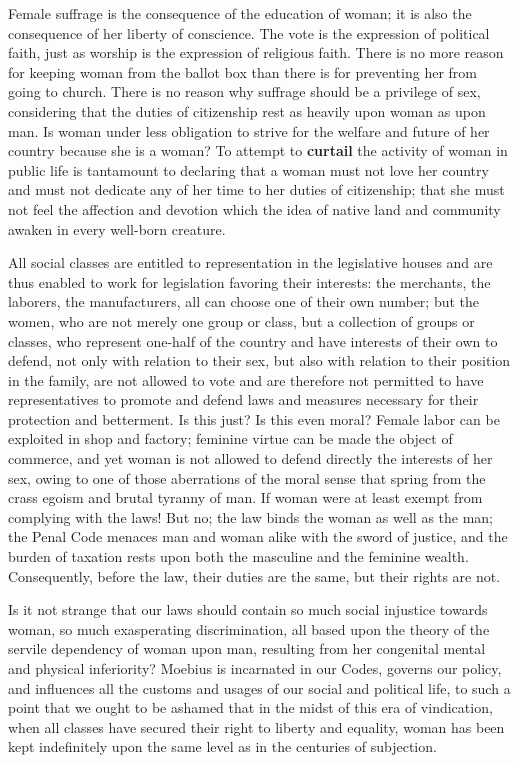 \begin{linenumbers}
\indent Female suffrage is the consequence of the education of woman; it is also the consequence of her liberty of conscience. The vote is the expression of political faith, just as worship is the expression of religious faith. There is no more reason for keeping woman from the ballot box than there is for preventing her from going to church. There is no reason why suffrage should be a privilege of sex, considering that the duties of citizenship rest as heavily upon woman as upon man. Is woman under less obligation to strive for the welfare and future of her country because she is a woman? To attempt to \textbf{curtail} the activity of woman in public life is tantamount to declaring that a woman must not love her country and must not dedicate any of her time to her duties of citizenship; that she must not feel the affection and devotion which the idea of native land and community awaken in every well-born creature.


\indent All social classes are entitled to representation in the legislative houses and are thus enabled to work for legislation favoring their interests: the merchants, the laborers, the manufacturers, all can choose one of their own number; but the women, who are not merely one group or class, but a collection of groups or classes, who represent one-half of the country and have interests of their own to defend, not only with relation to their sex, but also with relation to their position in the family, are not allowed to vote and are therefore not permitted to have representatives to promote and defend laws and measures necessary for their protection and betterment. Is this just? Is this even moral? Female labor can be exploited in shop and factory; feminine virtue can be made the object of commerce, and yet woman is not allowed to defend directly the interests of her sex, owing to one of those aberrations of the moral sense that spring from the crass egoism and brutal tyranny of man. If woman were at least exempt from complying with the laws! But no; the law binds the woman as well as the man; the Penal Code menaces man and woman alike with the sword of justice, and the burden of taxation rests upon both the masculine and the feminine wealth. Consequently, before the law, their duties are the same, but their rights are not.

\indent Is it not strange that our laws should contain so much social injustice towards woman, so much exasperating discrimination, all based upon the theory of the servile dependency of woman upon man, resulting from her congenital mental and physical inferiority? Moebius is incarnated in our Codes, governs our policy, and influences all the customs and usages of our social and political life, to such a point that we ought to be ashamed that in the midst of this era of vindication, when all classes have secured their right to liberty and equality, woman has been kept indefinitely upon the same level as in the centuries of subjection.


\end{linenumbers}
